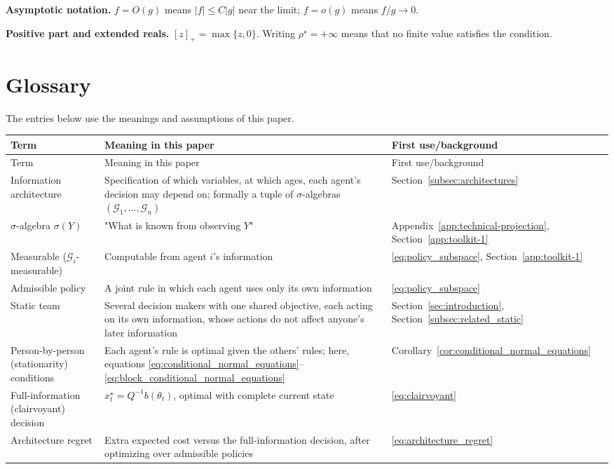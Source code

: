 \textbf{Asymptotic notation.} $f=O(g)$ means $|f|\le C|g|$ near the limit; $f=o(g)$ means $f/g\to0$.

\textbf{Positive part and extended reals.} $[z]_+=\max\{z,0\}$. Writing $\rho^\star=+\infty$ means that no finite value satisfies the condition.

\clearpage
\section{Glossary}
\label{app:glossary}
The entries below use the meanings and assumptions of this paper.
\small
\setlength{\tabcolsep}{4pt}
\renewcommand{\arraystretch}{1.12}
\begin{longtable}{@{}p{.23\linewidth}p{.52\linewidth}p{.20\linewidth}@{}}
\toprule
Term & Meaning in this paper & First use/background \\
\midrule
\endfirsthead
\toprule
Term & Meaning in this paper & First use/background \\
\midrule
\endhead
\bottomrule
\endfoot
Information architecture & Specification of which variables, at which ages, each agent's decision may depend on; formally a tuple of $\sigma$-algebras $(\mathcal G_1,\dots,\mathcal G_n)$ & Section~\ref{subsec:architectures} \\
$\sigma$-algebra $\sigma(Y)$ & "What is known from observing $Y$" & Appendix~\ref{app:technical-projection}, Section~\ref{app:toolkit-1} \\
Measurable ($\mathcal G_i$-measurable) & Computable from agent $i$'s information & \eqref{eq:policy_subspace}, Section~\ref{app:toolkit-1} \\
Admissible policy & A joint rule in which each agent uses only its own information & \eqref{eq:policy_subspace} \\
Static team & Several decision makers with one shared objective, each acting on its own information, whose actions do not affect anyone's later information & Section~\ref{sec:introduction}, Section~\ref{subsec:related_static} \\
Person-by-person (stationarity) conditions & Each agent's rule is optimal given the others' rules; here, equations \eqref{eq:conditional_normal_equations}--\eqref{eq:block_conditional_normal_equations} & Corollary~\ref{cor:conditional_normal_equations} \\
Full-information (clairvoyant) decision & $x^\star_t=Q^{-1}b(\theta_t)$, optimal with complete current state & \eqref{eq:clairvoyant} \\
Architecture regret & Extra expected cost versus the full-information decision, after optimizing over admissible policies & \eqref{eq:architecture_regret} \\

\end{longtable}
